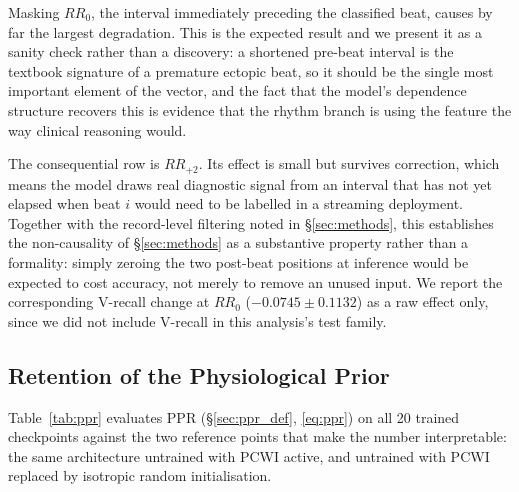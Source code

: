 \documentclass[journal,twoside,web]{ieeecolor}
\begin{document}
Masking $RR_{0}$, the interval immediately preceding the classified beat, causes by far the largest degradation. This is the expected result and we present it as a sanity check rather than a discovery: a shortened pre-beat interval is the textbook signature of a premature ectopic beat, so it should be the single most important element of the vector, and the fact that the model's dependence structure recovers this is evidence that the rhythm branch is using the feature the way clinical reasoning would.

The consequential row is $RR_{+2}$. Its effect is small but survives correction, which means the model draws real diagnostic signal from an interval that has not yet elapsed when beat $i$ would need to be labelled in a streaming deployment. Together with the record-level filtering noted in \S\ref{sec:methods}, this establishes the non-causality of \S\ref{sec:methods} as a substantive property rather than a formality: simply zeroing the two post-beat positions at inference would be expected to cost accuracy, not merely to remove an unused input. We report the corresponding V-recall change at $RR_0$ ($-0.0745\pm0.1132$) as a raw effect only, since we did not include V-recall in this analysis's test family.

\subsection{Retention of the Physiological Prior}
\label{sec:results_ppr}
Table~\ref{tab:ppr} evaluates PPR (\S\ref{sec:ppr_def}, \eqref{eq:ppr}) on all 20 trained checkpoints against the two reference points that make the number interpretable: the same architecture untrained with PCWI active, and untrained with PCWI replaced by isotropic random initialisation.

\begin{table}[!t]
\centering
\caption{Physiological Prior Retention \eqref{eq:ppr}, mean$\pm$std over 20 models, with the mean absolute per-edge parameter deviation from the prior. The untrained PCWI row is the null: PCWI initialises at the prior (up to its symmetry-breaking jitter), so it scores near-maximally by construction and PPR can only decrease with training.}
\label{tab:ppr}
\footnotesize
{}
\end{table}
\end{document}
